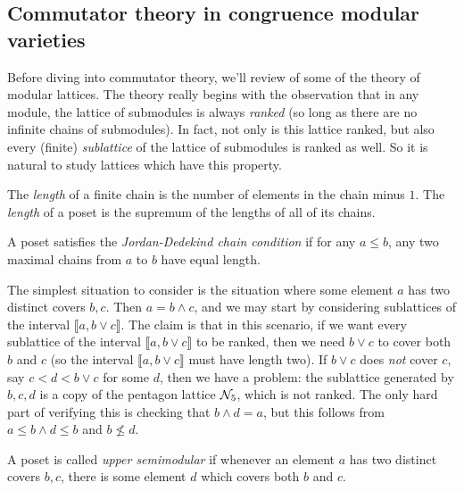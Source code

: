 
\begin{appendices}

\chapter{Commutator theory in congruence modular varieties}\label{a-commutator}

Before diving into commutator theory, we'll review of some of the theory of modular lattices. The theory really begins with the observation that in any module, the lattice of submodules is always \emph{ranked} (so long as there are no infinite chains of submodules). In fact, not only is this lattice ranked, but also every (finite) \emph{sublattice} of the lattice of submodules is ranked as well. So it is natural to study lattices which have this property.

\begin{defn} The \emph{length} of a finite chain is the number of elements in the chain minus $1$. The \emph{length} of a poset is the supremum of the lengths of all of its chains.
\end{defn}

\begin{defn} A poset satisfies the \emph{Jordan-Dedekind chain condition} if for any $a \le b$, any two maximal chains from $a$ to $b$ have equal length.
\end{defn}

The simplest situation to consider is the situation where some element $a$ has two distinct covers $b,c$. Then $a = b \wedge c$, and we may start by considering sublattices of the interval $\llbracket a, b \vee c \rrbracket$. The claim is that in this scenario, if we want every sublattice of the interval $\llbracket a, b \vee c \rrbracket$ to be ranked, then we need $b\vee c$ to cover both $b$ and $c$ (so the interval $\llbracket a, b \vee c \rrbracket$ must have length two). If $b \vee c$ does \emph{not} cover $c$, say $c < d < b \vee c$ for some $d$, then we have a problem: the sublattice generated by $b,c,d$ is a copy of the pentagon lattice $\mathcal{N}_5$, which is not ranked. The only hard part of verifying this is checking that $b \wedge d = a$, but this follows from $a \le b\wedge d \le b$ and $b \not\le d$.

\begin{defn} A poset is called \emph{upper semimodular} if whenever an element $a$ has two distinct covers $b,c$, there is some element $d$ which covers both $b$ and $c$.
\end{defn}


\end{appendices}
